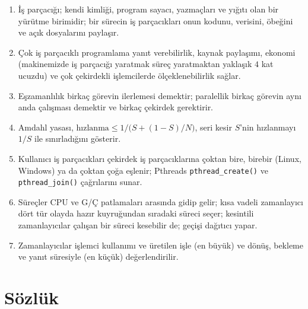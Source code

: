 \documentclass[11pt,a4paper]{article}
\newcommand{\cmd}[1]{\texttt{#1}}
\begin{document}
\begin{keyidea}
\begin{enumerate}[leftmargin=1.4em]
  \item İş parçacığı; kendi kimliği, program sayacı, yazmaçları ve yığıtı olan bir yürütme birimidir; bir sürecin iş parçacıkları onun kodunu, verisini, öbeğini ve açık dosyalarını paylaşır.
  \item Çok iş parçacıklı programlama yanıt verebilirlik, kaynak paylaşımı, ekonomi (makinemizde iş parçacığı yaratmak süreç yaratmaktan yaklaşık $4$ kat ucuzdu) ve çok çekirdekli işlemcilerde ölçeklenebilirlik sağlar.
  \item Eşzamanlılık birkaç görevin ilerlemesi demektir; paralellik birkaç görevin aynı anda çalışması demektir ve birkaç çekirdek gerektirir.
  \item Amdahl yasası, $\text{hızlanma} \le 1/\bigl(S + (1-S)/N\bigr)$, seri kesir $S$'nin hızlanmayı $1/S$ ile sınırladığını gösterir.
  \item Kullanıcı iş parçacıkları çekirdek iş parçacıklarına çoktan bire, birebir (Linux, Windows) ya da çoktan çoğa eşlenir; Pthreads \cmd{pthread\_create()} ve \cmd{pthread\_join()} çağrılarını sunar.
  \item Süreçler CPU ve G/Ç patlamaları arasında gidip gelir; kısa vadeli zamanlayıcı dört tür olayda hazır kuyruğundan sıradaki süreci seçer; kesintili zamanlayıcılar çalışan bir süreci kesebilir de; geçişi dağıtıcı yapar.
  \item Zamanlayıcılar işlemci kullanımı ve üretilen işle (en büyük) ve dönüş, bekleme ve yanıt süresiyle (en küçük) değerlendirilir.
\end{enumerate}
\end{keyidea}

\section{Sözlük}
\end{document}
